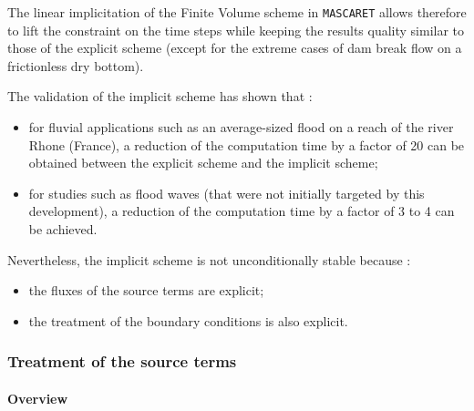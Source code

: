 \vspace{0.5cm}

The linear implicitation of the Finite Volume scheme in \texttt{MASCARET} allows therefore to lift the constraint on the time steps while keeping the results quality similar to those of the explicit scheme (except for the extreme cases of dam break flow on a frictionless dry bottom).

\vspace{0.5cm}

The validation of the implicit scheme has shown that :
\begin{itemize}
 \item for fluvial applications such as an average-sized flood on a reach of the river Rhone (France), a reduction of the computation time by a factor of 20 can be obtained between the explicit scheme and the implicit scheme;
 \item for studies such as flood waves (that were not initially targeted by this development), a reduction of the computation time by a factor of 3 to 4 can be achieved.
\end{itemize}

\vspace{0.5cm}

Nevertheless, the implicit scheme is not unconditionally stable because :
\begin{itemize}
 \item the fluxes of the source terms are explicit;
 \item the treatment of the boundary conditions is also explicit.
\end{itemize}






\subsubsection{Treatment of the source terms}

\label{TrtSource}

\paragraph{Overview\\}

\hspace*{1cm}


